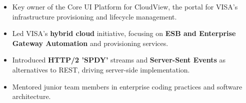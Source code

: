 \begin{itemize}
    \item Key owner of the Core UI Platform for CloudView, the portal for VISA’s infrastructure provisioning and lifecycle management.
    \item Led VISA’s \textbf{hybrid cloud} initiative, focusing on \textbf{ESB and Enterprise Gateway Automation} and provisioning services.
    \item Introduced \textbf{HTTP/2 'SPDY'} streams and \textbf{Server-Sent Events} as alternatives to REST, driving server-side implementation.
    \item Mentored junior team members in enterprise coding practices and software architecture.
\end{itemize}